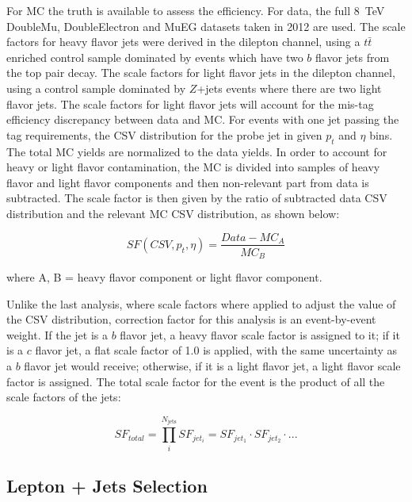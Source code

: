 \par For MC the truth is available to assess the efficiency.  For
data, the full 8~TeV DoubleMu, DoubleElectron and MuEG datasets taken
in 2012 are used. The scale factors for heavy flavor jets were derived in the
dilepton channel, using a $t\bar{t}$ enriched control sample dominated
by events which have two $b$ flavor jets from the top pair decay.  The
scale factors for light flavor jets in the dilepton channel, using a
control sample dominated by $Z$+jets events where there are two light
flavor jets. The scale factors for light flavor jets will account for
the mis-tag efficiency discrepancy between data and MC. For events
with one jet passing the tag requirements, the CSV
distribution for the probe jet in given $p_{t}$ and $\eta$ 
bins. The total MC yields are normalized to the data yields. In order to
account for heavy or light flavor contamination, the MC is divided into
samples of heavy flavor and light flavor components and then
non-relevant part from data is subtracted. The scale factor is then
given by the ratio of subtracted data CSV distribution and the relevant MC
CSV distribution, as shown below:

\begin{equation}
SF(CSV, p_{t}, \eta) = \frac{Data - MC_{A}}{MC_{B}} 
\end{equation}

\noindent where A, B = heavy flavor component or light flavor component.

\par Unlike the last analysis, where scale factors where applied to
adjust the value of the CSV distribution, correction factor for this
analysis is an event-by-event weight.  If the jet is a $b$ flavor jet,
a heavy flavor scale factor is assigned to it; if it is a $c$ flavor
jet, a flat scale factor of 1.0 is applied, with the same uncertainty
as a $b$ flavor jet would receive; otherwise, if it is a
light flavor jet, a light flavor scale factor is assigned.  The total
scale factor for the event is the product of all the scale factors of
the jets: 

\begin{equation}
SF_{total} = \prod_{i}^{N_{\mathrm{jets}}} SF_{jet_{i}} = SF_{jet_{1}} \cdot SF_{jet_{2}} \cdot ...
\end{equation}


\subsection{Lepton + Jets Selection}
\label{LJ_selection_II_overview}

